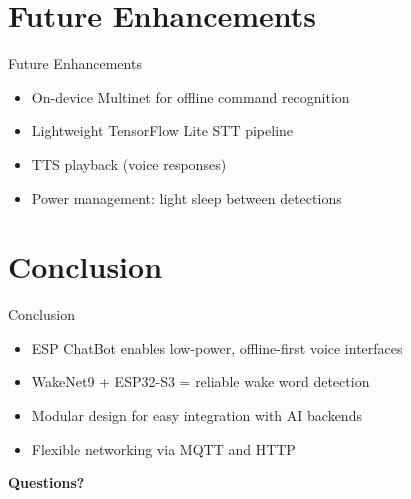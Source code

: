 \documentclass{beamer}
\begin{document}
\section{Future Enhancements}
\begin{frame}{Future Enhancements}
  \begin{itemize}
    \item On-device Multinet for offline command recognition
    \item Lightweight TensorFlow Lite STT pipeline
    \item TTS playback (voice responses)
    \item Power management: light sleep between detections
  \end{itemize}
\end{frame}

\section{Conclusion}
\begin{frame}{Conclusion}
  \begin{itemize}
    \item ESP ChatBot enables low-power, offline-first voice interfaces
    \item WakeNet9 + ESP32-S3 = reliable wake word detection
    \item Modular design for easy integration with AI backends
    \item Flexible networking via MQTT and HTTP
  \end{itemize}

  \vspace{5mm}
  \centering
  \textbf{Questions?}
\end{frame}
\end{document}
